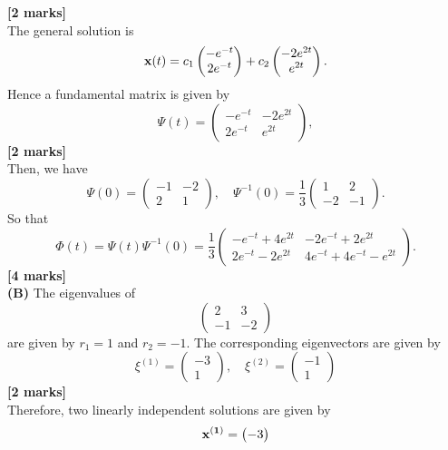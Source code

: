 \documentclass[11pt,a4paper]{article}
\begin{document}
\begin{enumerate}
		\hspace*{0pt}\hfill\textbf{[2 marks]}\\
		The general solution is
		$$
		\vb{x}(t) = c_1
		\begin{pmatrix}
			-e^{-t}\\
			2e^{-t}
		\end{pmatrix} + c_2
		\begin{pmatrix}
			-2e^{2t}\\
			e^{2t}
		\end{pmatrix}.
		$$
		Hence a fundamental matrix is given by
		$$
		\Psi (t) =
		\begin{pmatrix}
			-e^{-t} & -2e^{2t}\\
			2e^{-t} & e^{2t}
		\end{pmatrix},
		$$
		\hfill\textbf{[2 marks]}\\
		Then, we have
		$$
		\Psi(0) =
		\begin{pmatrix}
			-1 & -2\\
			2 & 1
		\end{pmatrix},\quad
		\Psi^{-1}(0) = \frac{1}{3}
		\begin{pmatrix}
			1 & 2\\
			-2 & -1
		\end{pmatrix}.
		$$
		So that
		$$
		\Phi(t) = \Psi(t)\Psi^{-1}(0) = \frac{1}{3}
		\begin{pmatrix}
			-e^{-t} + 4e^{2t} & -2e^{-t} + 2e^{2t}\\
			2e^{-t} - 2e^{2t} & 4e^{-t} + 4e^{-t} - e^{2t}
		\end{pmatrix}.
		$$
		\hfill\textbf{[4 marks]}\\
		\textbf{(B)} The eigenvalues of
		$$
		\begin{pmatrix}
			2 & 3\\
			-1 & -2
		\end{pmatrix}
		$$
		are given by $r_1 = 1$ and $r_2 = −1$. The corresponding eigenvectors are given by
		$$
		\xi^{(1)} = 
		\begin{pmatrix}
			-3\\
			1
		\end{pmatrix},\quad \xi^{(2)}=
		\begin{pmatrix}
			-1\\
			1
		\end{pmatrix}
		$$
		\hfill\textbf{[2 marks]}\\
		Therefore, two linearly independent solutions are given by
		$$
		\vb{x^{(1)}} = 
		\begin{pmatrix}
			-3\\

\end{pmatrix}$$
\end{enumerate}
\end{document}
